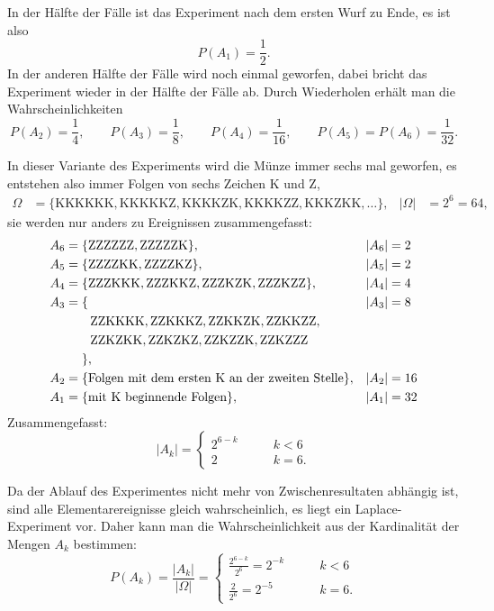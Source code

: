 \begin{loesung}
\begin{teilaufgaben}
In der Hälfte der Fälle ist das Experiment nach dem ersten Wurf zu Ende,
es ist also
\[
P(A_1) = \frac12.
\]
In der anderen Hälfte der Fälle wird noch einmal geworfen, dabei bricht das 
Experiment wieder in der Hälfte der Fälle ab.
Durch Wiederholen erhält man die Wahrscheinlichkeiten
\[
P(A_2)=\frac14,\qquad
P(A_3)=\frac18,\qquad
P(A_4)=\frac1{16},\qquad
P(A_5)=P(A_6)=\frac1{32}.
\]
\item
In dieser Variante des Experiments wird die Münze immer sechs mal geworfen,
es entstehen also immer Folgen von sechs Zeichen K und Z,
\begin{align*}
\Omega&=\{
\text{KKKKKK},
\text{KKKKKZ},
\text{KKKKZK},
\text{KKKKZZ},
\text{KKKZKK},\dots
\},&|\Omega|&=2^6=64,
\end{align*}
sie werden nur anders zu Ereignissen zusammengefasst:
\begin{align*}
A_6&=\{\text{ZZZZZZ}, \text{ZZZZZK}\},&|A_6|&=2\\
A_5&=\{
\text{ZZZZKK},
\text{ZZZZKZ}
\},&|A_5|&=2\\
A_4&=\{
\text{ZZZKKK},
\text{ZZZKKZ},
\text{ZZZKZK},
\text{ZZZKZZ}
\},&|A_4|&=4\\
A_3&=\{
&|A_3|&=8\\
&\qquad
\text{ZZKKKK},
\text{ZZKKKZ},
\text{ZZKKZK},
\text{ZZKKZZ},\\
&\qquad\text{ZZKZKK},
\text{ZZKZKZ},
\text{ZZKZZK},
\text{ZZKZZZ}\\
&\phantom{\mathstrut=\mathstrut }\},\\
A_2&=\{\text{Folgen mit dem ersten K an der zweiten Stelle}\},&|A_2|&=16\\
A_1&=\{\text{mit K beginnende Folgen}\},&|A_1|&=32\\
\end{align*}
Zusammengefasst:
\[
|A_k|=\begin{cases}
2^{6-k}&\qquad k<6\\
2&\qquad k=6.
\end{cases}
\]
\item
Da der Ablauf des Experimentes nicht mehr von Zwischenresultaten abhängig ist,
sind alle Elementarereignisse gleich wahrscheinlich, es liegt ein Laplace-Experiment
vor.
Daher kann man die Wahrscheinlichkeit aus der Kardinalität der Mengen $A_k$
bestimmen:
\[
P(A_k)=\frac{|A_k|}{|\Omega|}
=\begin{cases}
\frac{2^{6-k}}{2^6}=2^{-k}&\qquad k<6\\
\frac{2}{2^6}=2^{-5}&\qquad k=6.
\end{cases}
\]
\item

\end{teilaufgaben}
\end{loesung}
